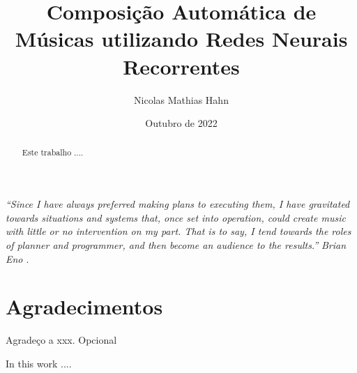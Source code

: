 \documentclass{automatextcc}
\begin{document}
\title{Composição Automática de Músicas utilizando Redes Neurais Recorrentes}
\author{Nicolas Mathias Hahn}



\dept{\DEST}

\date{Outubro de 2022}


\maketitulo

\makefolhaderosto

\makefolhadeaprovacaoA %


\newpage
\vspace*{\fill}
\begin{flushright} %
	\textit{``Since I have always preferred making plans to executing them, I have gravitated towards situations and systems that, once set into operation, could create music with little or no intervention on my part. That is to say, I tend towards the roles of planner and programmer, and then become an audience to the results.''} \newline
	\textit{Brian Eno \citep{alpern1995}}.
\end{flushright}

\newpage
\chapter*{Agradecimentos}
Agradeço a xxx. Opcional %


\begin{abstract}
Este trabalho ....
\end{abstract}
\begin{englishabstract}
In this work ....
\end{englishabstract}

\tableofcontents

\listoffigures
\end{document}

